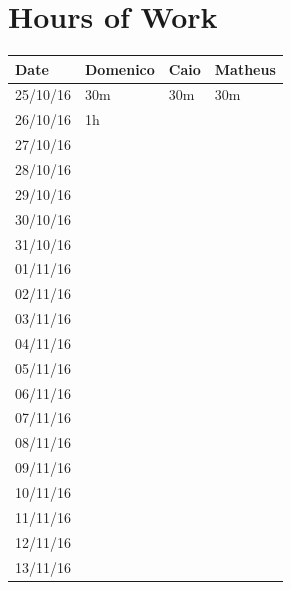 \documentclass[a4paper]{article}
\begin{document}
\section{Hours of Work}
\begin{tabular}{ | l | l | l | l | }
\hline
	\textbf {Date} & \textbf {Domenico} & \textbf {Caio} & \textbf {Matheus} \\ \hline
	25/10/16& 30m & 30m & 30m \\ \hline
	26/10/16& 1h &  &  \\ \hline
	27/10/16&  &  &  \\ \hline
	28/10/16&  &  &  \\ \hline
	29/10/16&  &  &  \\ \hline
	30/10/16&  &  &  \\ \hline
	31/10/16&  &  &  \\ \hline
	01/11/16&  &  &  \\ \hline
	02/11/16&  &  &  \\ \hline
	03/11/16&  &  &  \\ \hline
	04/11/16&  &  &  \\ \hline
	05/11/16&  &  &  \\ \hline
	06/11/16&  &  &  \\ \hline
	07/11/16&  &  &  \\ \hline
	08/11/16&  &  &  \\ \hline
	09/11/16&  &  &  \\ \hline
	10/11/16&  &  &  \\ \hline
	11/11/16&  &  &  \\ \hline
	12/11/16&  &  &  \\ \hline
	13/11/16&  &  &  \\ \hline
\end{tabular}

\newpage
\end{document}
